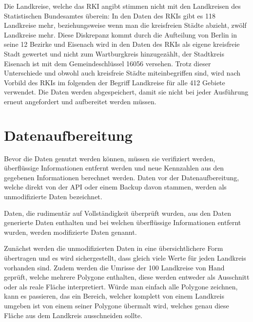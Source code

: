 
Die Landkreise, welche das RKI angibt stimmen nicht mit den Landkreisen des Statistischen Bundesamtes überein: In den Daten des RKIs gibt es 118 Landkreise mehr, beziehungsweise wenn man die kreisfreien Städte abzieht, zwölf Landkreise mehr. Diese Diskrepanz kommt durch die Aufteilung von Berlin in seine 12 Bezirke und Eisenach wird in den Daten des RKIs als eigene kreisfreie Stadt gewertet und nicht zum Wartburgkreis hinzugezählt, der Stadtkreis Eisenach ist mit dem Gemeindeschlüssel 16056 versehen. Trotz dieser Unterschiede und obwohl auch kreisfreie Städte miteinbegriffen sind, wird nach Vorbild des RKIs im folgenden der Begriff \glqq{}Landkreise\grqq{} für alle 412 Gebiete verwendet.
Die Daten werden abgespeichert, damit sie nicht bei jeder Ausführung erneut angefordert und aufbereitet werden müssen.
\section{Datenaufbereitung}
Bevor die Daten genutzt werden können, müssen sie verifiziert werden, überflüssige Informationen entfernt werden und neue Kennzahlen aus den gegebenen Informationen berechnet werden. Daten vor der Datenaufbereitung, welche direkt von der API oder einem Backup davon stammen, werden als \glqq{}unmodifizierte\grqq{} Daten bezeichnet. 

Daten, die rudimentär auf Vollständigkeit überprüft wurden, aus den Daten generierte Daten enthalten und bei welchen überflüssige Informationen entfernt wurden, werden \glqq{}modifizierte\grqq{} Daten genannt.

Zunächst werden die unmodifizierten Daten in eine übersichtlichere Form übertragen und es wird sichergestellt, dass gleich viele Werte für jeden Landkreis vorhanden sind. Zudem werden die Umrisse der 100 Landkreise von Hand geprüft, welche mehrere Polygone enthalten, diese werden entweder als Ausschnitt oder als reale Fläche interpretiert. Würde man einfach alle Polygone zeichnen, kann es passieren, das ein Bereich, welcher komplett von einem Landkreis umgeben ist von einem seiner Polygone übermalt wird, welches genau diese Fläche aus dem Landkreis ausschneiden sollte.

